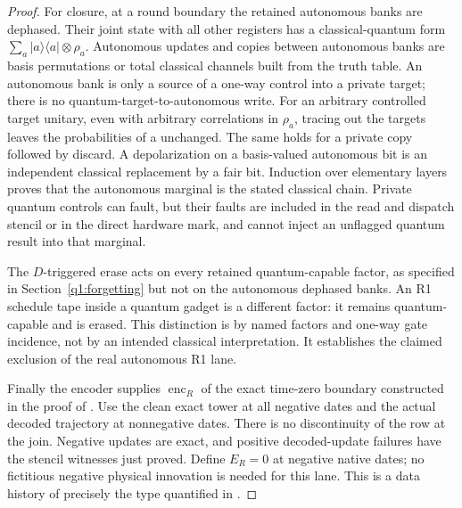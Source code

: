 \begin{proof}
For closure, at a round boundary the retained autonomous banks are dephased. Their joint state with all other registers has a classical-quantum form \(\sum _{a} \lvert a\rangle\langle a\rvert\otimes\rho_{a}\). Autonomous updates and copies between autonomous banks are basis permutations or total classical channels built from the truth table. An autonomous bank is only a source of a one-way control into a private target; there is no quantum-target-to-autonomous write. For an arbitrary controlled target unitary, even with arbitrary correlations in \(\rho_{a}\), tracing out the targets leaves the probabilities of a unchanged. The same holds for a private copy followed by discard. A depolarization on a basis-valued autonomous bit is an independent classical replacement by a fair bit. Induction over elementary layers proves that the autonomous marginal is the stated classical chain. Private quantum controls can fault, but their faults are included in the read and dispatch stencil or in the direct hardware mark, and cannot inject an unflagged quantum result into that marginal.

The \(D\)-triggered erase acts on every retained quantum-capable factor, as specified in Section~\ref{q1:forgetting} but not on the autonomous dephased banks. An R1 schedule tape inside a quantum gadget is a different factor: it remains quantum-capable and is erased. This distinction is by named factors and one-way gate incidence, not by an intended classical interpretation. It establishes the claimed exclusion of the real autonomous R1 lane.

Finally the encoder supplies \(\operatorname{enc}_{R}\) of the exact time-zero boundary constructed in the proof of \cite[Lemma~\ref*{cl:lem:past}]{DMNoise1D2026}. Use the clean exact tower at all negative dates and the actual decoded trajectory at nonnegative dates. There is no discontinuity of the row at the join. Negative updates are exact, and positive decoded-update failures have the stencil witnesses just proved. Define \(E_{R}=0\) at negative native dates; no fictitious negative physical innovation is needed for this lane. This is a data history of precisely the type quantified in \cite[Proposition~\ref*{cl:prop:organization}]{DMNoise1D2026}. 
\end{proof}




